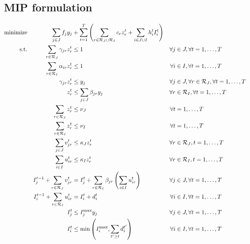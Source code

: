 \documentclass[a4paper,10pt]{article}
\begin{document}
\begin{linenumbers}
\subsection{MIP formulation}\label{subsection:MIP}
\begin{alignat}{3}
    \text{minimize} &&\sum_{j\in \dc} f_j y_j &+\sum_{t=1}^{T} \left( \sum_{r\in \rd\cup\rc} c_r z^t_r + \sum_{i\in \dc\cup\cu} h^t_i I_i^t\right)\label{objfunct}\\ 
    \text{s.t.}  &&\sum_{r\in \rd} \gamma_{jr} z^t_r &\leq 1 															&\forall j&\in \dc, \forall t=1,\ldots,T  \label{const:singleroutedepots}\\
                 &&\sum_{r\in \rc} \alpha_{ir} z^t_r &\leq 1 															&\forall i&\in \cu, \forall t=1,\ldots,T  \label{const:singleroutecustomers}\\
                 &&\gamma_{jr}z^t_r 					&\leq y_j 													&\forall j&\in\dc, \forall r\in \rd, \forall t=1,\ldots,T\label{const:serveopendepots}\\
                 &&z^t_r 					&\leq \sum_{j\in\dc}\beta_{jr}y_j 													&\forall r&\in \rc, \forall t=1,\ldots,T\label{const:startfromopendepots}\\
                 &&\sum_{r\in \rd} z^t_r &\leq 	\nu_{\dc}													&\forall t&=1,\ldots,T  \label{const:fleetcapadepots}\\
                 &&\sum_{r\in \rc} z^t_r &\leq 	\nu_{\cu}													&\forall t&=1,\ldots,T  \label{const:fleetcapaclients}\\
                 &&\sum_{j\in \dc} v^t_{jr}   		&\leq \kd z^t_r 														&\forall r&\in \rd, t=1,\ldots,T\label{const:deliveryUBdepots}\\
                 &&\sum_{i\in \cu} u^t_{ir}   		&\leq \kc z^t_r 														&\forall r&\in \rc, t=1,\ldots,T\label{const:deliveryUBcustomers}\\
                 &&I^{t-1}_j + \sum_{r\in\rd} v^t_{jr}   			&=I^t_j +\sum_{r\in \rc}\beta_{jr} \left(\sum_{i\in \cu}u^t_{ir}\right) 			&\forall j&\in \dc, \forall t=1,\ldots,T \label{const:invflowdepots}\\
                 &&I^{t-1}_i+\sum_{r\in \rc} u^t_{ir} &= I^t_i +d^t_i 							&\forall i&\in \cu, \forall t=1,\ldots,T\label{const:invflowcustomers}\\
                 &&I^t_j					& \leq I_j^{\max} y_j  														&\forall j&\in \dc,\forall t=1,\ldots,T\label{const:invdepotUB}\\	
                 &&I^t_i 					&\leq \min\left(I_i^{\max}, \sum_{t'\geq t}d^{t'}_i\right)											&\forall i&\in \cu, \forall t=1,\ldots,T\label{const:invcustUB}\\

\end{alignat}
\end{linenumbers}
\end{document}

